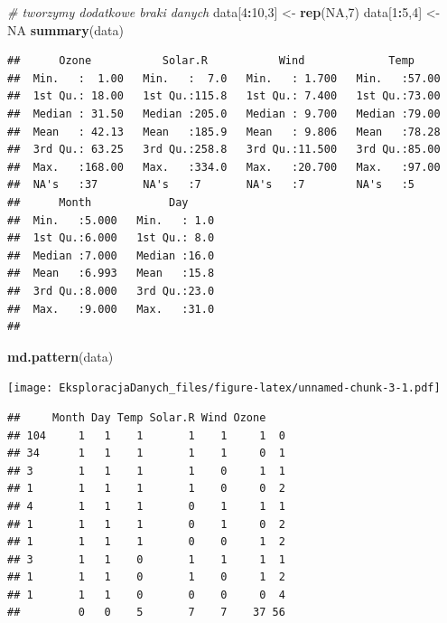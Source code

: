 \documentclass[]{book}
\newenvironment{Shaded}{\begin{snugshade}}{\end{snugshade}}
\newcommand{\CommentTok}[1]{\textcolor[rgb]{0.56,0.35,0.01}{\textit{#1}}}
\newcommand{\DecValTok}[1]{\textcolor[rgb]{0.00,0.00,0.81}{#1}}
\newcommand{\KeywordTok}[1]{\textcolor[rgb]{0.13,0.29,0.53}{\textbf{#1}}}
\newcommand{\NormalTok}[1]{#1}
\newcommand{\OperatorTok}[1]{\textcolor[rgb]{0.81,0.36,0.00}{\textbf{#1}}}
\newcommand{\OtherTok}[1]{\textcolor[rgb]{0.56,0.35,0.01}{#1}}
\newcommand{\StringTok}[1]{\textcolor[rgb]{0.31,0.60,0.02}{#1}}
\theoremstyle{plain}
\theoremstyle{definition}
\begin{document}
\begin{Shaded}
\begin{Highlighting}[]
\CommentTok{# tworzymy dodatkowe braki danych}
\NormalTok{data[}\DecValTok{4}\OperatorTok{:}\DecValTok{10}\NormalTok{,}\DecValTok{3}\NormalTok{] <-}\StringTok{ }\KeywordTok{rep}\NormalTok{(}\OtherTok{NA}\NormalTok{,}\DecValTok{7}\NormalTok{)}
\NormalTok{data[}\DecValTok{1}\OperatorTok{:}\DecValTok{5}\NormalTok{,}\DecValTok{4}\NormalTok{] <-}\StringTok{ }\OtherTok{NA}
\KeywordTok{summary}\NormalTok{(data)}
\end{Highlighting}
\end{Shaded}

\begin{verbatim}
##      Ozone           Solar.R           Wind             Temp      
##  Min.   :  1.00   Min.   :  7.0   Min.   : 1.700   Min.   :57.00  
##  1st Qu.: 18.00   1st Qu.:115.8   1st Qu.: 7.400   1st Qu.:73.00  
##  Median : 31.50   Median :205.0   Median : 9.700   Median :79.00  
##  Mean   : 42.13   Mean   :185.9   Mean   : 9.806   Mean   :78.28  
##  3rd Qu.: 63.25   3rd Qu.:258.8   3rd Qu.:11.500   3rd Qu.:85.00  
##  Max.   :168.00   Max.   :334.0   Max.   :20.700   Max.   :97.00  
##  NA's   :37       NA's   :7       NA's   :7        NA's   :5      
##      Month            Day      
##  Min.   :5.000   Min.   : 1.0  
##  1st Qu.:6.000   1st Qu.: 8.0  
##  Median :7.000   Median :16.0  
##  Mean   :6.993   Mean   :15.8  
##  3rd Qu.:8.000   3rd Qu.:23.0  
##  Max.   :9.000   Max.   :31.0  
## 
\end{verbatim}

\begin{Shaded}
\begin{Highlighting}[]
\KeywordTok{md.pattern}\NormalTok{(data)}
\end{Highlighting}
\end{Shaded}

\texttt{[image: EksploracjaDanych\_files/figure-latex/unnamed-chunk-3-1.pdf]}

\begin{verbatim}
##     Month Day Temp Solar.R Wind Ozone   
## 104     1   1    1       1    1     1  0
## 34      1   1    1       1    1     0  1
## 3       1   1    1       1    0     1  1
## 1       1   1    1       1    0     0  2
## 4       1   1    1       0    1     1  1
## 1       1   1    1       0    1     0  2
## 1       1   1    1       0    0     1  2
## 3       1   1    0       1    1     1  1
## 1       1   1    0       1    0     1  2
## 1       1   1    0       0    0     0  4
##         0   0    5       7    7    37 56
\end{verbatim}
\end{document}
